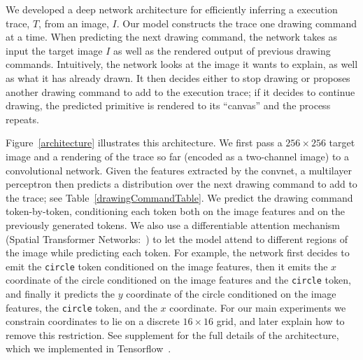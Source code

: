 \documentclass{article}
\newcommand{\remark}[1]{\textcolor{red}{[#1]}}
\begin{document}
We developed a deep network architecture for efficiently inferring a
execution trace, $T$, from an image, $I$.  Our model constructs the
trace one drawing command at a time.  When predicting the next drawing
command, the network takes as input the target image $I$ as well as
the rendered output of previous drawing commands.  Intuitively, the
network looks at the image it wants to explain, as well as what it has
already drawn.  It then decides either to stop drawing or proposes
another drawing command to add to the execution trace; if it decides
to continue drawing, the predicted primitive is rendered to its
``canvas'' and the process repeats.

Figure~\ref{architecture} illustrates this architecture.  We first
pass a $256\times 256$ target image and a rendering of the trace so
far (encoded as a two-channel image) to a convolutional network. Given
the features extracted by the convnet, a multilayer perceptron then
predicts a distribution over the next drawing command to add to the
trace; see Table~\ref{drawingCommandTable}.  We predict the drawing
command token-by-token, conditioning each token both on the image
features and on the previously generated tokens. We also use a
differentiable attention mechanism (Spatial Transformer
Networks:~\cite{jaderberg2015spatial}) to let the model attend to
different regions of the image while predicting each token. For
example, the network first decides to emit the \verb|circle| token
conditioned on the image features, then it emits the $x$ coordinate of
the circle conditioned on the image features and the \verb|circle|
token, and finally it predicts the $y$ coordinate of the circle
conditioned on the image features, the \verb|circle| token, and the
$x$ coordinate. For our main experiments we constrain
coordinates to lie on a discrete $16\times 16$ grid, and later explain
how to remove this restriction.  See supplement for the full details
of the architecture, which we implemented in
Tensorflow~\cite{tensorflow2015-whitepaper}.
\end{document}
